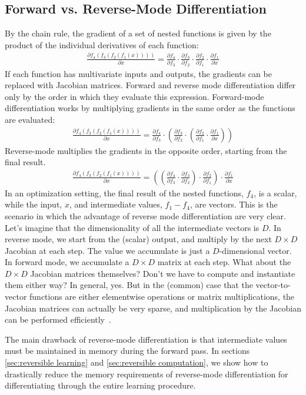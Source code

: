 \documentclass{article}
\newcommand{\pderiv}[2]{\frac{\partial #1}{\partial #2}}
\begin{document}
\subsection{Forward vs. Reverse-Mode Differentiation}
By the chain rule, the gradient of a set of nested functions is given by the product of the individual derivatives of each function:
%
\begin{align*}
\pderiv{f_4(f_3(f_2(f_1(x))))}{x} = \pderiv{f_4}{f_3} \cdot \pderiv{f_3}{f_2} \cdot \pderiv{f_2}{f_1} \cdot \pderiv{f_1}{x}
\end{align*}
If each function has multivariate inputs and outputs, the gradients can be
replaced with Jacobian matrices. Forward and reverse mode differentiation differ
only by the order in which they evaluate this expression.
%
Forward-mode differentiation works by multiplying gradients in the same order as
the functions are evaluated:
%
\begin{align*}
\pderiv{f_4(f_3(f_2(f_1(x))))}{x} = \pderiv{f_4}{f_3} \cdot \left( \pderiv{f_3}{f_2} \cdot \left( \pderiv{f_2}{f_1} \cdot \pderiv{f_1}{x} \right) \right)
\end{align*}
%
Reverse-mode multiplies the gradients in the opposite order, starting from the
final result.
%
\begin{align*}
\pderiv{f_4(f_3(f_2(f_1(x))))}{x} = \left(  \left(  \pderiv{f_4}{f_3} \cdot \pderiv{f_3}{f_2} \right) \cdot \pderiv{f_2}{f_1} \right) \cdot \pderiv{f_1}{x} 
\end{align*}
%
In an optimization setting, the final result of the nested functions, $f_4$, is
a scalar, while the input, $x$, and intermediate values, $f_1 - f_4$, are
vectors. This is the scenario in which the advantage of reverse mode
differentiation are very clear. Let's imagine that the dimensionality of all the
intermediate vectors is $D$. In reverse mode, we start from the (scalar) output,
and multiply by the next $D \times D$ Jacobian at each step. The value we
accumulate is just a $D$-dimensional vector. In forward mode, we accumulate a $D
\times D$ matrix at each step. What about the $D \times D$ Jacobian matrices
themselves?  Don't we have to compute and instantiate them either way?  In
general, yes. But in the (common) case that the vector-to-vector functions are
either elementwise operations or matrix multiplications, the Jacobian matrices
can actually be very sparse, and multiplication by the Jacobian can be performed
efficiently~\cite{pearlmutter2008reverse}.

The main drawback of reverse-mode differentiation is that intermediate values must be
maintained in memory during the forward pass. In sections \ref{sec:reversible learning} and \ref{sec:reversible computation}, we show how to drastically reduce the memory requirements of reverse-mode differentiation for differentiating through the entire learning procedure.
\end{document}
